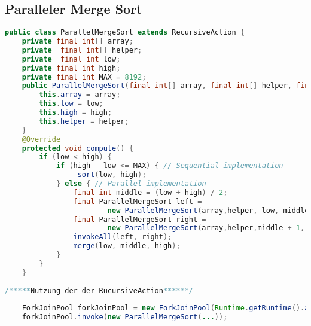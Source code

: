 \subsection{Paralleler Merge Sort}

\begin{lstlisting}[language=java,caption={paralleler Merge sort (Quelle: \cite{MergeSortParallel})},label=lst:MergeSortParallel]
public class ParallelMergeSort extends RecursiveAction {
    private final int[] array;
    private  final int[] helper;
    private  final int low;
    private final int high;
    private final int MAX = 8192;
    public ParallelMergeSort(final int[] array, final int[] helper, final int low, final int high){
        this.array = array;
        this.low = low;
        this.high = high;
        this.helper = helper;
    }
    @Override
    protected void compute() {
        if (low < high) {
            if (high - low <= MAX) { // Sequential implementation
                 sort(low, high);
            } else { // Parallel implementation
                final int middle = (low + high) / 2;
                final ParallelMergeSort left =
                        new ParallelMergeSort(array,helper, low, middle);
                final ParallelMergeSort right =
                        new ParallelMergeSort(array,helper,middle + 1, high);
                invokeAll(left, right);
                merge(low, middle, high);
            }
        }
    } 
    
/*****Nutzung der der RucursiveAction******/
    
    ForkJoinPool forkJoinPool = new ForkJoinPool(Runtime.getRuntime().availableProcessors() - 1);
    forkJoinPool.invoke(new ParallelMergeSort(...));
\end{lstlisting}